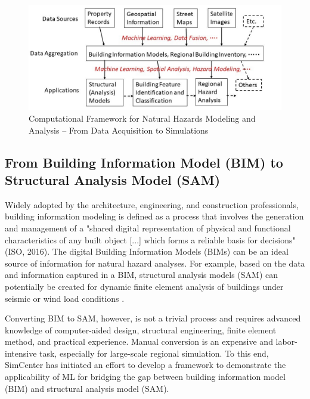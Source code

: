 \begin{figure}[htb]
    \centering
    \includegraphics[width=1.0\textwidth, angle = 0]{Figures/AI_NHE_Computational_Framework.png}
    \caption{Computational Framework for Natural Hazards Modeling and Analysis – From Data Acquisition to Simulations}
    \label{fig:AI_NHE_Computational_Framework}
\end{figure}

\subsection{From Building Information Model (BIM) to Structural Analysis Model (SAM)}

Widely adopted by the architecture, engineering, and construction professionals, building information modeling is defined as a process that involves the generation and management of a "shared digital representation of physical and functional characteristics of any built object [...] which forms a reliable basis for decisions" (ISO, 2016). The digital Building Information Models (BIMs) can be an ideal source of information for natural hazard analyses. For example, based on the data and information captured in a BIM, structural analysis models (SAM) can potentially be created for dynamic finite element analysis of buildings under seismic or wind load conditions \citep{lu2020cimpowered}. 

Converting BIM to SAM, however, is not a trivial process and requires advanced knowledge of computer-aided design, structural engineering, finite element method, and practical experience. Manual conversion is an expensive and labor-intensive task, especially for large-scale regional simulation. To this end, SimCenter has initiated an effort to develop a framework to demonstrate the applicability of ML for bridging the gap between building information model (BIM) and structural analysis model (SAM).

